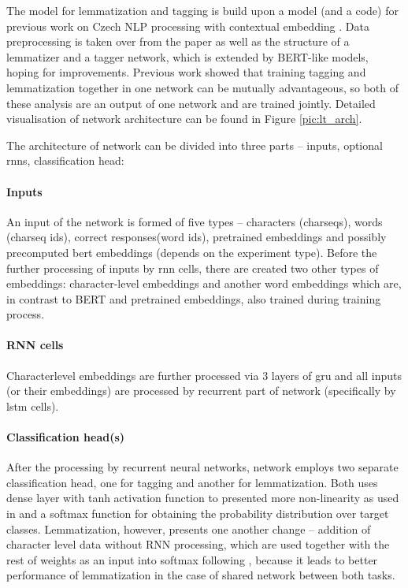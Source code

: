 The model for lemmatization and tagging is build upon a model (and a code) for previous work on Czech NLP processing with contextual embedding \citep{straka2019czech}. 
Data preprocessing is taken over from the paper as well as the structure of a lemmatizer and a tagger network, which is extended by BERT-like models, hoping for improvements. %
Previous work showed that training tagging and lemmatization together in one network can be mutually advantageous, so both of these analysis are an output of one network and are trained jointly. Detailed visualisation of network architecture can be found in Figure \ref{pic:lt_arch}. \par The architecture of network can be divided into three parts -- inputs, optional \acrshort{rnn}s, classification head:
\paragraph{Inputs}
An input of the network is formed of five types -- characters (charseqs), words (charseq ids), correct responses(word ids), pretrained embeddings and possibly precomputed bert embeddings (depends on the experiment type). Before the further processing of inputs by \acrshort{rnn} cells, there are created two other types of embeddings: character-level embeddings and another word embeddings which are, in contrast to BERT and pretrained embeddings, also trained during training process.

\paragraph{RNN cells}
Characterlevel embeddings are further processed via 3 layers of \acrfull{gru} and all inputs (or their embeddings) are processed by recurrent part of network (specifically by \acrfull{lstm} cells).

\paragraph{Classification head(s)}
After the processing by recurrent neural networks, network employs two separate classification head, one for tagging and another for lemmatization. Both uses dense layer with tanh activation function to presented more non-linearity as used in \citep{Straka2018} and a softmax function for obtaining the probability distribution over target classes. Lemmatization, however, presents one another change -- addition of character level data without RNN processing, which are used together with the rest of weights as an input into softmax following \citep{Straka2018}, because it leads to better performance of lemmatization in the case of shared network between both tasks.

